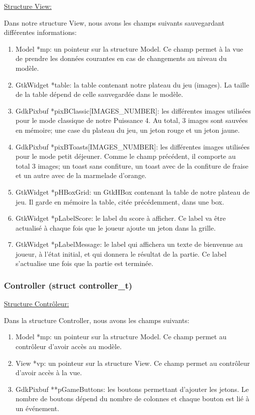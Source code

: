 \documentclass[a4paper, 11pt, oneside]{article}
\begin{document}
\hspace{5mm}
\underline{Structure View:}


Dans notre structure View, nous avons les champs suivants sauvegardant différentes informations:

\begin{enumerate}
    \item Model *mp: un pointeur sur la structure Model. Ce champ permet à la vue de prendre les données courantes en cas de changements au niveau du modèle.
    \item  GtkWidget *table: la table contenant notre plateau du jeu (images). La taille de la table dépend de celle sauvegardée dans le modèle.
    \item GdkPixbuf *pixBClassic[IMAGES\_NUMBER]: les différentes images utilisées pour le mode classique de notre Puissance 4. Au total, 3 images sont sauvées en mémoire; une case du plateau du jeu, un jeton rouge et un jeton jaune.
    \item GdkPixbuf *pixBToasts[IMAGES\_NUMBER]: les différentes images utilisées pour le mode petit déjeuner. Comme le champ précédent, il comporte au total 3 images; un toast sans confiture, un toast avec de la confiture de fraise et un autre avec de la marmelade d'orange.
    \item GtkWidget *pHBoxGrid: un GtkHBox contenant la table de notre plateau de jeu. Il garde en mémoire la table, citée précédemment, dans une box.
    \item GtkWidget *pLabelScore: le label du score à afficher. Ce label va être actualisé à chaque fois que le joueur ajoute un jeton dans la grille.
    \item GtkWidget *pLabelMessage: le label qui affichera un texte de bienvenue au joueur, à l'état initial, et qui donnera le résultat de la partie. Ce label s'actualise une fois que la partie est terminée.
\end{enumerate}

\subsubsection{Controller (struct controller\_t)}

\hspace{5mm}
\underline{Structure Contrôleur:}


Dans la structure Controller, nous avons les champs suivants:
\begin{enumerate}
    \item Model *mp: un pointeur sur la structure Model. Ce champ permet au contrôleur d'avoir accès au modèle.
    \item  View *vp: un pointeur sur la structure View. Ce champ permet au contrôleur d'avoir accès à la vue.
    \item GdkPixbuf **pGameButtons: les boutons permettant d'ajouter les jetons. Le nombre de boutons dépend du nombre de colonnes et chaque bouton est lié à un événement.
\end{enumerate}
\end{document}
